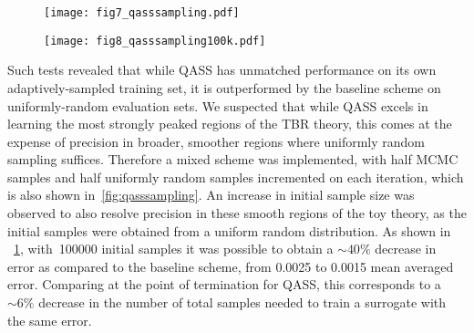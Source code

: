 \begin{figure}[h]
\centering
\begin{minipage}{.48\textwidth}
  \centering
  \texttt{[image: fig7\_qasssampling.pdf]}
  \label{fig:qasssampling}
\end{minipage}%
\hfill%
\begin{minipage}{.48\textwidth}
  \centering
  \texttt{[image: fig8\_qasssampling100k.pdf]}
  \label{fig:qasssampling100k}
\end{minipage}
\end{figure}

Such tests revealed that while QASS has unmatched performance on its own
adaptively-sampled training set, it is outperformed by the baseline scheme on
uniformly-random evaluation sets. We suspected that while QASS excels in
learning the most strongly peaked regions of the TBR theory, this comes at the
expense of precision in broader, smoother regions where uniformly random
sampling suffices. Therefore a mixed scheme was implemented, with half MCMC
samples and half uniformly random samples incremented on each iteration, which
is also shown in~\cref{fig:qasssampling}. An increase in initial sample size was observed to also resolve precision in these smooth regions of the toy theory, as the initial samples were obtained from a uniform random distribution. As shown in ~\cref{fig:qasssampling100k}, with~\num{100000} initial samples it was possible to obtain a ${\sim}40\%$ decrease in error as compared to the baseline scheme, from 0.0025 to 0.0015 mean averaged error. Comparing at the point of termination for QASS, this corresponds to a ${\sim}6\%$ decrease in the number of total samples needed to train a surrogate with the same error. 



